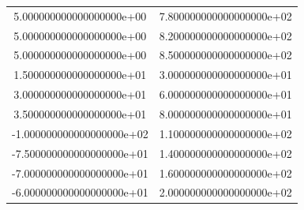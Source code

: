 \begin{table}
\begin{tabular}{S S}
5.000000000000000000e+00 & 7.800000000000000000e+02\\
5.000000000000000000e+00 & 8.200000000000000000e+02\\
5.000000000000000000e+00 & 8.500000000000000000e+02\\
1.500000000000000000e+01 & 3.000000000000000000e+01\\
3.000000000000000000e+01 & 6.000000000000000000e+01\\
3.500000000000000000e+01 & 8.000000000000000000e+01\\
-1.000000000000000000e+02 & 1.100000000000000000e+02\\
-7.500000000000000000e+01 & 1.400000000000000000e+02\\
-7.000000000000000000e+01 & 1.600000000000000000e+02\\
-6.000000000000000000e+01 & 2.000000000000000000e+02\\
\bottomrule
\end{tabular}
\end{table}

